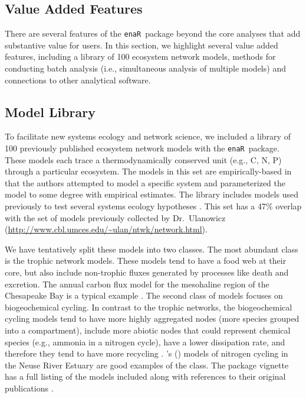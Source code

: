\documentclass[11pt]{article}
\def\citeapos#1{\citeauthor{#1}'s (\citeyear{#1})}
\newcommand{\enaR}{\texttt{enaR}}
\begin{document}
\begin{spacing}{2}
\section{Value Added Features}
There are several features of the \enaR\ package beyond the core
analyses that add substantive value for users.  In this section, we
highlight several value added features, including a library of 100
ecosystem network models, methods for conducting batch analysis (i.e.,
simultaneous analysis of multiple models) and connections to other
analytical software.

\subsection{Model Library}
To facilitate new systems ecology and network science, we included a
library of 100 previously published ecosystem network models with the
\enaR\ package. These models each trace a thermodynamically conserved
unit (e.g., C, N, P) through a particular ecosystem.  The models in
this set are empirically-based in that the authors attempted to model
a specific system and parameterized the model to some degree with
empirical estimates.  The library includes models used previously to
test several systems ecology hypotheses \citep{borrett10_idd,
  borrett10_hmg, salas11_did, borrett13}.  This set has a 47\%
overlap with the set of models previously collected by Dr.\ Ulanowicz
(\url{http://www.cbl.umces.edu/~ulan/ntwk/network.html}).

We have tentatively split these models into two classes.  The most
abundant class is the trophic network models. %
These models tend to have a food web at their core, but also include
non-trophic fluxes generated by processes like death and excretion.
The annual carbon flux model for the mesohaline region of the
Chesapeake Bay is a typical example \citep{baird89}.  The second class
of models focuses on biogeochemical cycling.  %
In contrast to the trophic networks, the biogeochemical cycling models
tend to have more highly aggregated nodes (more species grouped into a
compartment), include more abiotic nodes that could represent chemical
species (e.g., ammonia in a nitrogen cycle), have a lower dissipation
rate, and therefore they tend to have more recycling
\citep{christian96, borrett10_idd}.  \citeapos{christian03} models of
nitrogen cycling in the Neuse River Estuary are good examples of the
class.  The package vignette has a full listing of the models included
along with references to their original publications \citep{enar}.


\end{spacing}
\end{document}
